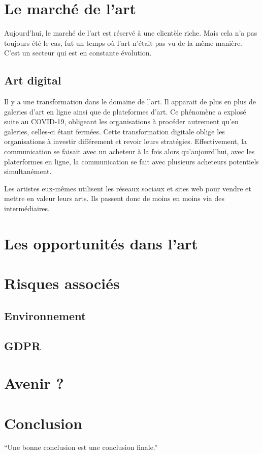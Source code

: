 \documentclass[a4paper,11pt]{article}
\begin{document}
\section{Le marché de l'art} %
Aujourd'hui, le marché de l'art est réservé à une clientèle riche. Mais cela n'a pas toujours été le cas, fut un temps où l'art n'était pas vu de la même manière. C'est un secteur qui est en constante évolution. 
\subsection{Art digital} %
Il y a une transformation dans le domaine de l'art. Il apparait de plus en plus de galeries d'art en ligne ainsi que de plateformes d'art. Ce phénomène a explosé suite au COVID-19, obligeant les organisations à procéder autrement qu'en galeries, celles-ci étant fermées. Cette transformation digitale oblige les organisations à investir différement et revoir leurs stratégies. Effectivement, la communication se faisait avec un acheteur à la fois alors qu'aujourd'hui, avec les platerformes en ligne, la communication se fait avec plusieurs acheteurs potentiels simultanément. 

Les artistes eux-mêmes utilisent les réseaux sociaux et sites web pour vendre et mettre en valeur leurs arts. Ils passent donc de moins en moins via des intermédiaires. 
\section{Les opportunités dans l'art} %

\section{Risques associés} %
\subsection{Environnement} %

\subsection{GDPR} %
\section{Avenir ?} %

\section{Conclusion} %
\enquote{Une bonne conclusion est une conclusion finale.}

\break
\printbibliography[
heading=bibintoc,
title={Bibliographie}
]
\end{document}
